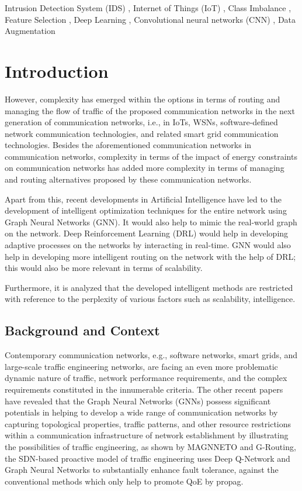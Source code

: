 \documentclass[a4paper,fleqn]{cas-dc}
\numberwithin{equation}{section}
\begin{document}
\begin{keywords}
Intrusion Detection System (IDS) \sep 
Internet of Things (IoT) \sep 
Class Imbalance \sep 
Feature Selection \sep
Deep Learning \sep 
Convolutional neural networks (CNN) \sep
Data Augmentation
\end{keywords}


\maketitle



\section{Introduction}
However, complexity has emerged within the options in terms of routing and managing the flow of traffic of the proposed communication networks in the next generation of communication networks, i.e., in IoTs, WSNs, software-defined network communication technologies, and related smart grid communication technologies. Besides the aforementioned communication networks in communication networks, complexity in terms of the impact of energy constraints on communication networks has added more complexity in terms of managing and routing alternatives proposed by these communication networks.



Apart from this, recent developments in Artificial Intelligence have led to the development of intelligent optimization techniques for the entire network using Graph Neural Networks (GNN). It would also help to mimic the real-world graph on the network. Deep Reinforcement Learning (DRL) would help in developing adaptive processes on the networks by interacting in real-time. GNN would also help in developing more intelligent routing on the network with the help of DRL; this would also be more relevant in terms of scalability.



Furthermore, it is analyzed that the developed intelligent methods are restricted with reference to the perplexity of various factors such as scalability, intelligence.
\subsection{Background and Context}
Contemporary communication networks, e.g., software networks, smart grids, and large-scale traffic engineering networks, are facing an even more problematic dynamic nature of traffic, network performance requirements, and the complex requirements constituted in the innumerable criteria. The other recent papers have revealed that the Graph Neural Networks (GNNs) possess significant potentials in helping to develop a wide range of communication networks by capturing topological properties, traffic patterns, and other resource restrictions within a communication infrastructure of network establishment by illustrating the possibilities of traffic engineering, as shown by MAGNNETO and G-Routing, the SDN-based proactive model of traffic engineering uses Deep Q-Network and Graph Neural Networks to substantially enhance fault tolerance, against the conventional methods which only help to promote QoE by propag.
\end{document}
